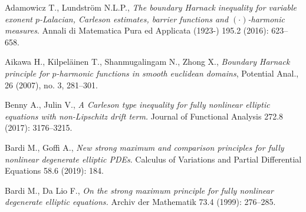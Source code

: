 \documentclass[12pt]{article}
\numberwithin{komcounter}{section}
\begin{document}
\begin{thebibliography}{A}

Adamowicz T., Lundstr\"om N.L.P.,
\emph{The boundary Harnack inequality for variable exonent $p$-Lalacian, Carleson estimates, barrier functions and ${(\cdot)}$-harmonic measures}.
Annali di Matematica Pura ed Applicata (1923-) 195.2 (2016): 623--658.


Aikawa H., Kilpel\"ainen T., Shanmugalingam N., Zhong X.,
\emph{Boundary Harnack principle for $p$-harmonic functions in smooth euclidean domains},
Potential Anal., 26 (2007), no. 3, 281--301.


Benny A., Julin V.,
\emph{A Carleson type inequality for fully nonlinear elliptic equations with non-Lipschitz drift term.}
Journal of Functional Analysis 272.8 (2017): 3176--3215.




Bardi M., Goffi A.,
\emph{New strong maximum and comparison principles for fully nonlinear degenerate elliptic PDEs}.
Calculus of Variations and Partial Differential Equations 58.6 (2019): 184.

Bardi M., Da Lio F.,
\emph{On the strong maximum principle for fully nonlinear degenerate elliptic equations.}
Archiv der Mathematik 73.4 (1999): 276--285.


\end{thebibliography}
\end{document}
